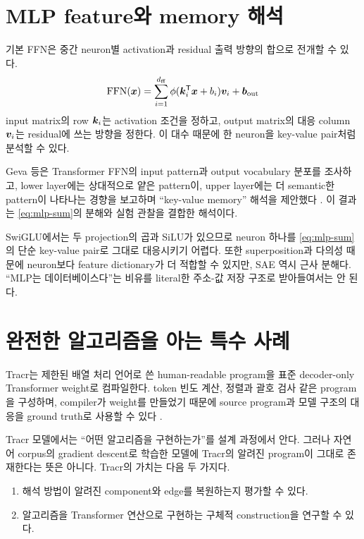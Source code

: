 \section{MLP feature와 memory 해석}

기본 FFN은 중간 neuron별 activation과 residual 출력 방향의 합으로 전개할 수 있다.
\begin{equation}
  \operatorname{FFN}(\bm{x})=
  \sum_{i=1}^{d_{\mathrm{ff}}}
  \phi(\bm{k}_i^{\mathsf T}\bm{x}+b_i)\bm{v}_i+\bm{b}_{\mathrm{out}}
  \label{eq:mlp-sum}
\end{equation}
input matrix의 row $\bm{k}_i$는 activation 조건을 정하고, output matrix의 대응 column $\bm{v}_i$는 residual에 쓰는 방향을 정한다.
이 대수 때문에 한 neuron을 key-value pair처럼 분석할 수 있다.

Geva 등은 Transformer FFN의 input pattern과 output vocabulary 분포를 조사하고, lower layer에는 상대적으로 얕은 pattern이, upper layer에는 더 semantic한 pattern이 나타나는 경향을 보고하며 ``key-value memory'' 해석을 제안했다 \citep{geva2021ffn}.
이 결과는 \cref{eq:mlp-sum}의 분해와 실험 관찰을 결합한 해석이다.

SwiGLU에서는 두 projection의 곱과 SiLU가 있으므로 neuron 하나를 \cref{eq:mlp-sum}의 단순 key-value pair로 그대로 대응시키기 어렵다.
또한 superposition과 다의성 때문에 neuron보다 feature dictionary가 더 적합할 수 있지만, SAE 역시 근사 분해다.
``MLP는 데이터베이스다''는 비유를 literal한 주소-값 저장 구조로 받아들여서는 안 된다.

\section{완전한 알고리즘을 아는 특수 사례}

Tracr는 제한된 배열 처리 언어로 쓴 human-readable program을 표준 decoder-only Transformer weight로 컴파일한다.
token 빈도 계산, 정렬과 괄호 검사 같은 program을 구성하며, compiler가 weight를 만들었기 때문에 source program과 모델 구조의 대응을 ground truth로 사용할 수 있다 \citep{lindner2023tracr}.

Tracr 모델에서는 ``어떤 알고리즘을 구현하는가''를 설계 과정에서 안다.
그러나 자연어 corpus의 gradient descent로 학습한 모델에 Tracr의 알려진 program이 그대로 존재한다는 뜻은 아니다.
Tracr의 가치는 다음 두 가지다.

\begin{enumerate}
  \item 해석 방법이 알려진 component와 edge를 복원하는지 평가할 수 있다.
  \item 알고리즘을 Transformer 연산으로 구현하는 구체적 construction을 연구할 수 있다.
\end{enumerate}

